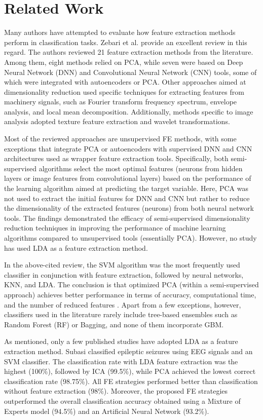 \documentclass[11pt,a4paper]{article}
\begin{document}
\section{Related Work}
Many authors have attempted to evaluate how feature extraction methods perform in classification tasks. Zebari et al. \citep{zebari2020comprehensive} provide an excellent review in this regard.  
The authors reviewed 21 feature extraction methods from the literature. Among them, eight methods relied on PCA, while seven were based on Deep Neural Network (DNN) and Convolutional Neural Network (CNN) tools, some of which were integrated with autoencoders or PCA.  
Other approaches aimed at dimensionality reduction used specific techniques for extracting features from machinery signals, such as Fourier transform frequency spectrum, envelope analysis, and local mean decomposition. Additionally, methods specific to image analysis adopted texture feature extraction and wavelet transformations.

Most of the reviewed approaches are unsupervised FE methods, with some exceptions that integrate PCA or autoencoders with supervised DNN and CNN architectures used as wrapper feature extraction tools. Specifically, both semi-supervised algorithms select the most optimal features (neurons from hidden layers or image features from convolutional layers) based on the performance of the learning algorithm aimed at predicting the target variable.  
Here, PCA was not used to extract the initial features for DNN and CNN but rather to reduce the dimensionality of the extracted features (neurons) from both neural network tools.  
The findings demonstrated the efficacy of semi-supervised dimensionality reduction techniques in improving the performance of machine learning algorithms compared to unsupervised tools (essentially PCA).  
However, no study has used LDA as a feature extraction method.

In the above-cited review, the SVM algorithm was the most frequently used classifier in conjunction with feature extraction, followed by neural networks, KNN, and LDA.  
The conclusion is that optimized PCA (within a semi-supervised approach) achieves better performance in terms of accuracy, computational time, and the number of reduced features \citep{ma2019dimension, zebari2020comprehensive}.  
Apart from a few exceptions, however, classifiers used in the literature rarely include tree-based ensembles such as Random Forest (RF) or Bagging, and none of them incorporate GBM.

As mentioned, only a few published studies have adopted LDA as a feature extraction method.  
Subasi \citep{subasi2010eeg} classified epileptic seizures using EEG signals and an SVM classifier. The classification rate with LDA feature extraction was the highest (100\%), followed by ICA (99.5\%), while PCA achieved the lowest correct classification rate (98.75\%).  
All FE strategies performed better than classification without feature extraction (98\%). Moreover, the proposed FE strategies outperformed the overall classification accuracy obtained using a Mixture of Experts model (94.5\%) and an Artificial Neural Network (93.2\%).
\end{document}
